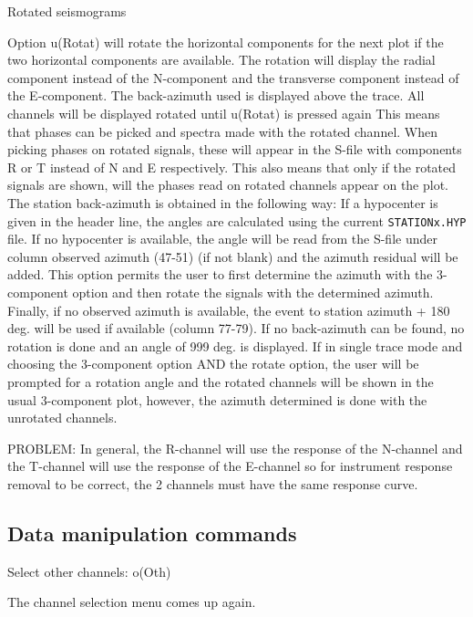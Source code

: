 Rotated seismograms 

Option u(Rotat) will rotate the horizontal components for the next plot if the two horizontal components are available. The rotation will display the radial component instead of the N-component and the transverse component instead of the E-component. The back-azimuth used is displayed above the trace. All channels will be displayed  rotated until u(Rotat) is pressed again This means that phases can be picked and spectra made with the rotated channel. When picking phases on rotated signals, these will appear in the S-file with components R or T instead of N and E respectively. This also means that only if the rotated signals are shown, will the phases read on rotated channels appear on the plot. The station back-azimuth is obtained in the following way: If a hypocenter is given in the header line, the angles are calculated using the current \texttt{STATIONx.HYP} file. If no hypocenter is available, the angle will be read from the S-file under column observed azimuth (47-51) (if not blank) and the azimuth residual will be added. This option permits the user to first determine the azimuth with the 3-component option and then rotate the signals with the determined azimuth. Finally, if no observed azimuth is available, the event to station azimuth + 180 deg. will be used if available (column 77-79). If no back-azimuth can be found, no rotation is done and an angle of 999 deg. is displayed. If in single trace mode and choosing the 3-component option AND the rotate option, the user will be prompted for a rotation angle and the rotated channels will be shown in the usual 3-component plot, however, the azimuth determined is done with the unrotated channels. 

PROBLEM: In general, the R-channel will use the response of the N-channel and the T-channel will use the response of the E-channel so for instrument response removal to be correct, the 2 channels must have the same response curve. 

\subsection{Data manipulation commands}

Select other channels: o(Oth) 

The channel selection menu comes up again. 

